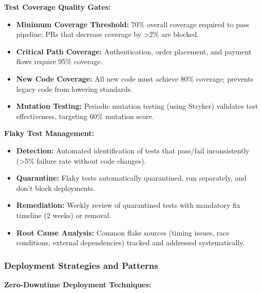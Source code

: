 \documentclass[12pt,a4paper]{article}
\begin{document}
\textbf{Test Coverage Quality Gates:}

\begin{itemize}[leftmargin=2em, itemsep=6pt]
    \item \textbf{Minimum Coverage Threshold:} 70\% overall coverage required to pass pipeline; PRs that decrease coverage by >2\% are blocked.
    \item \textbf{Critical Path Coverage:} Authentication, order placement, and payment flows require 95\% coverage.
    \item \textbf{New Code Coverage:} All new code must achieve 80\% coverage; prevents legacy code from lowering standards.
    \item \textbf{Mutation Testing:} Periodic mutation testing (using Stryker) validates test effectiveness, targeting 60\% mutation score.
\end{itemize}

\vspace{0.5em}

\textbf{Flaky Test Management:}

\begin{itemize}[leftmargin=2em, itemsep=6pt]
    \item \textbf{Detection:} Automated identification of tests that pass/fail inconsistently (>5\% failure rate without code changes).
    \item \textbf{Quarantine:} Flaky tests automatically quarantined, run separately, and don't block deployments.
    \item \textbf{Remediation:} Weekly review of quarantined tests with mandatory fix timeline (2 weeks) or removal.
    \item \textbf{Root Cause Analysis:} Common flake sources (timing issues, race conditions, external dependencies) tracked and addressed systematically.
\end{itemize}

\subsubsection{Deployment Strategies and Patterns}

\textbf{Zero-Downtime Deployment Techniques:}
\end{document}
